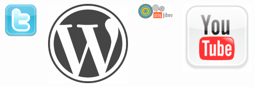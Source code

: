 \documentclass[green]{beamer}
\begin{document}
\begin{frame}
\begin{columns}[t]
    \begin{center}
	    \includegraphics[scale=0.20]{img/twitter.png}
    \end{center}
    \begin{center}
	    \includegraphics[scale=0.10]{img/blog.png}
    \end{center}
    \begin{center}
	    \includegraphics[scale=0.4]{img/rediris.png}
    \end{center}
    
     \begin{center}
	    \includegraphics[scale=0.10]{img/youtube.png}
    \end{center}
	
    \end{columns} 
\end{frame}
\end{document}
